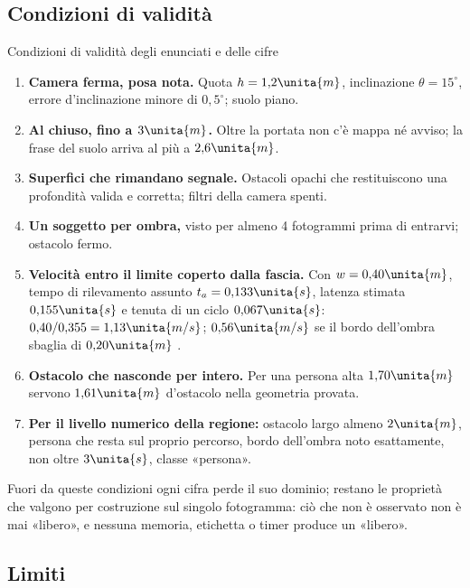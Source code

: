 \subsection{Condizioni di validità}\label{sec:lim-validita}

\begin{riquadro}{Condizioni di validità degli enunciati e delle cifre}
\begin{enumerate}[label=\arabic*.,itemsep=1pt]
\item \textbf{Camera ferma, posa nota.} Quota $h=1{,}2\unita{m}$, inclinazione $\theta=15^\circ$, errore d'inclinazione minore di $0{,}5^\circ$; suolo piano.
\item \textbf{Al chiuso, fino a $3\unita{m}$.} Oltre la portata non c'è mappa né avviso; la frase del suolo arriva al più a $2{,}6\unita{m}$.
\item \textbf{Superfici che rimandano segnale.} Ostacoli opachi che restituiscono una profondità valida e corretta; filtri della camera spenti.
\item \textbf{Un soggetto per ombra,} visto per almeno 4 fotogrammi prima di entrarvi; ostacolo fermo.
\item \textbf{Velocità entro il limite coperto dalla fascia.} Con $w=0{,}40\unita{m}$, tempo di rilevamento assunto $t_a=0{,}133\unita{s}$, latenza stimata $0{,}155\unita{s}$ e tenuta di un ciclo $0{,}067\unita{s}$: $0{,}40/0{,}355=1{,}13\unita{m/s}$; $0{,}56\unita{m/s}$ se il bordo dell'ombra sbaglia di $0{,}20\unita{m}$ .
\item \textbf{Ostacolo che nasconde per intero.} Per una persona alta $1{,}70\unita{m}$ servono $1{,}61\unita{m}$ d'ostacolo nella geometria provata.
\item \textbf{Per il livello numerico della regione:} ostacolo largo almeno $2\unita{m}$, persona che resta sul proprio percorso, bordo dell'ombra noto esattamente, non oltre $3\unita{s}$, classe «persona».
\end{enumerate}
Fuori da queste condizioni ogni cifra perde il suo dominio; restano le proprietà che valgono per costruzione sul singolo fotogramma: ciò che non è osservato non è mai «libero», e nessuna memoria, etichetta o timer produce un «libero».
\end{riquadro}

\subsection{Limiti}\label{sec:lim-limiti}

